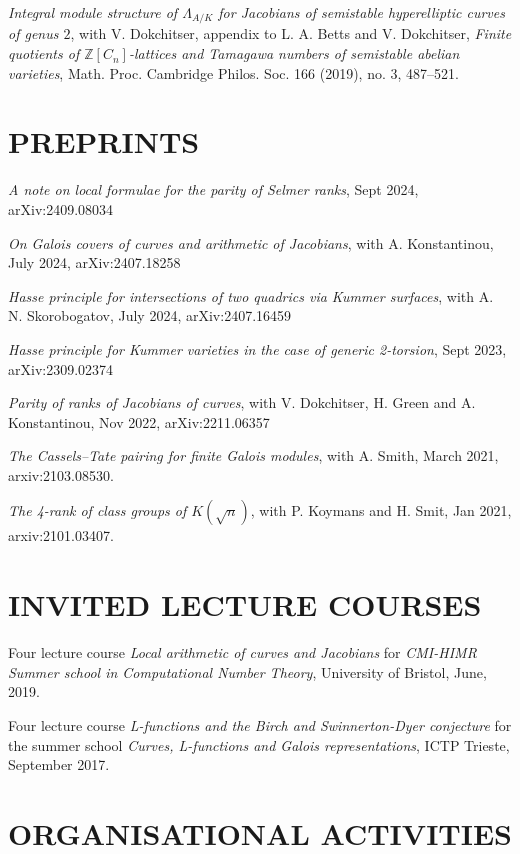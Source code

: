 \documentclass{res}
\begin{document}
\begin{resume}
   {\it Integral module structure of $\Lambda_{A/K}$ for Jacobians of
semistable hyperelliptic curves of genus $2$}, with V. Dokchitser, appendix to L. A. Betts and V. Dokchitser, {\it Finite quotients of  $\mathbb{Z}[C_n]$-lattices and Tamagawa numbers of semistable abelian varieties}, Math. Proc. Cambridge Philos. Soc. 166 (2019), no. 3, 487–521. 
%
\section{PREPRINTS}         
        
\bigskip

{\it A note on local formulae for the parity of Selmer ranks}, Sept 2024, arXiv:2409.08034

{\it On Galois covers of curves and arithmetic of Jacobians}, with A. Konstantinou, July 2024, arXiv:2407.18258

{\it Hasse principle for intersections of two quadrics via Kummer surfaces}, with A. N. Skorobogatov, July 2024, arXiv:2407.16459

{\it Hasse principle for Kummer varieties in the case of generic 2-torsion}, Sept 2023, arXiv:2309.02374


{\it Parity of ranks of Jacobians of curves}, with V. Dokchitser, H. Green and A. Konstantinou, Nov 2022, arXiv:2211.06357   



{\it The Cassels--Tate pairing for finite Galois modules}, with A. Smith, March 2021, arxiv:2103.08530. \

{\it The 4-rank of class groups of $K(\sqrt{n}) $}, with P. Koymans and H. Smit, Jan 2021, arxiv:2101.03407. \






\section{INVITED LECTURE COURSES}

\bigskip
\vspace{-0.1in}
Four lecture course {\it Local arithmetic of curves and Jacobians} for {\it CMI-HIMR Summer school in Computational Number Theory}, University of Bristol, June, 2019.

Four lecture course {\it L-functions and the Birch and Swinnerton-Dyer conjecture} for the summer school {\it Curves, L-functions and Galois representations}, ICTP Trieste, September 2017.\

 \section{ORGANISATIONAL ACTIVITIES}
 

\end{resume}
\end{document}
